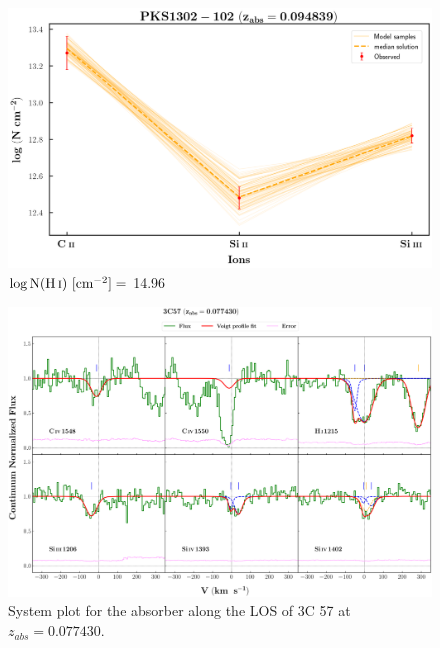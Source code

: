   \begin{figure}[!h]
    \centering
    \includegraphics[width=0.9\linewidth]{Ionisation-Modelling-Plots/pks1302-z=0.094839-compII_logZ=1.png}
    \caption{$\log \text{N}(\ion{H}{i}) \ [\text{cm}^{-2}]=$ 14.96}
  \end{figure}
  
  \restoregeometry
  
  \newpage
  \thispagestyle{empty}

  \begin{landscape}
  
  \begin{figure}
      \centering
      \vspace{-10mm}
      \hspace*{-20mm}
      \includegraphics[width=1.1\linewidth]{System-Plots/3C57_z=0.077430_sys_plot.png}
      \caption{System plot for the absorber along the LOS of 3C 57 at $z_{abs} = 0.077430$. }
  \end{figure}
  
  \end{landscape}
  
